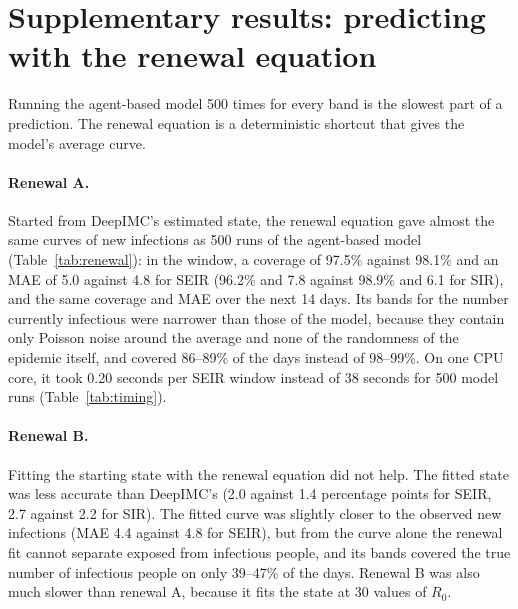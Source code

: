 \documentclass[12pt]{article}
\begin{document}
\section{Supplementary results: predicting with the renewal equation}\label{sec:res-renewal}

Running the agent-based model 500 times for every band is the slowest part of a prediction. The renewal
equation is a deterministic shortcut that gives the model's average curve.

\paragraph{Renewal A.} Started from DeepIMC's estimated state, the renewal equation gave almost the same
curves of new infections as 500 runs of the agent-based model (Table~\ref{tab:renewal}): in the window, a
coverage of 97.5\% against 98.1\% and an MAE of 5.0 against 4.8 for SEIR (96.2\% and 7.8 against 98.9\% and
6.1 for SIR), and the same coverage and MAE over the next 14 days. Its bands for the number currently infectious were narrower than those of the model, because
they contain only Poisson noise around the average and none of the randomness of the epidemic itself, and
covered 86--89\% of the days instead of 98--99\%. On one CPU core, it took 0.20 seconds per SEIR window
instead of 38 seconds for 500 model runs (Table~\ref{tab:timing}).

\paragraph{Renewal B.} Fitting the starting state with the renewal equation did not help. The fitted state was
less accurate than DeepIMC's (2.0 against 1.4 percentage points for SEIR, 2.7 against 2.2 for SIR). The fitted
curve was slightly closer to the observed new infections (MAE 4.4 against 4.8 for SEIR), but from the curve
alone the renewal fit cannot separate exposed from infectious people, and its bands covered the true number of
infectious people on only 39--47\% of the days. Renewal B was also much slower than renewal A, because it fits
the state at 30 values of $R_0$.

\begin{table}[htbp]
\centering
\caption{From DeepIMC's estimates to curves on the simulated test windows: 500 runs of the agent-based
model, or the renewal equation started from DeepIMC's state (A) or from a state fitted by the renewal
equation (B). Starting-state error (percentage points); coverage (\%) of the true curves and MAE of the
median curve; seconds per window during the evaluation, on shared computers (Table~\ref{tab:timing}
compares the times on one dedicated core).}
\label{tab:renewal}
\small
\resizebox{\textwidth}{!}{}
\end{table}
\end{document}
